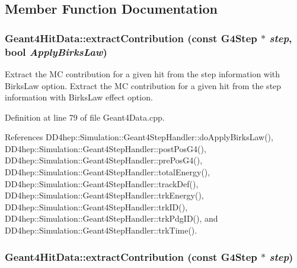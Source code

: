 \subsection{Member Function Documentation}
\hypertarget{class_d_d4hep_1_1_simulation_1_1_geant4_hit_data_a53b06813612ad68f26dc3ad1ca2662b3}{
\subsubsection[{extractContribution}]{ Geant4HitData::extractContribution (const G4Step $\ast$ {\em step}, \/  bool {\em ApplyBirksLaw})}}
\label{class_d_d4hep_1_1_simulation_1_1_geant4_hit_data_a53b06813612ad68f26dc3ad1ca2662b3}


Extract the MC contribution for a given hit from the step information with BirksLaw option. Extract the MC contribution for a given hit from the step information with BirksLaw effect option. 

Definition at line 79 of file Geant4Data.cpp.

References DD4hep::Simulation::Geant4StepHandler::doApplyBirksLaw(), DD4hep::Simulation::Geant4StepHandler::postPosG4(), DD4hep::Simulation::Geant4StepHandler::prePosG4(), DD4hep::Simulation::Geant4StepHandler::totalEnergy(), DD4hep::Simulation::Geant4StepHandler::trackDef(), DD4hep::Simulation::Geant4StepHandler::trkEnergy(), DD4hep::Simulation::Geant4StepHandler::trkID(), DD4hep::Simulation::Geant4StepHandler::trkPdgID(), and DD4hep::Simulation::Geant4StepHandler::trkTime().\hypertarget{class_d_d4hep_1_1_simulation_1_1_geant4_hit_data_aa05fcd729fd401c61e2fa7a48887efc5}{
\subsubsection[{extractContribution}]{ Geant4HitData::extractContribution (const G4Step $\ast$ {\em step})}}
\label{class_d_d4hep_1_1_simulation_1_1_geant4_hit_data_aa05fcd729fd401c61e2fa7a48887efc5}



